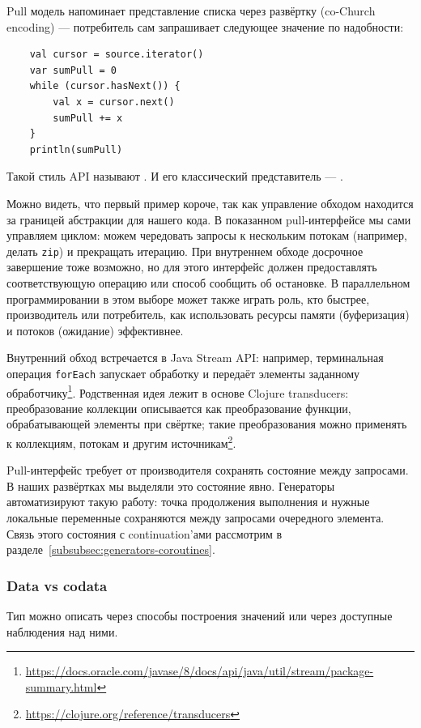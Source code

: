 Pull модель напоминает представление списка через развёртку (co-Church encoding) --- потребитель сам запрашивает следующее значение по надобности:
\begin{verbatim}
    val cursor = source.iterator()
    var sumPull = 0
    while (cursor.hasNext()) {
        val x = cursor.next()
        sumPull += x
    }
    println(sumPull)
\end{verbatim}
Такой стиль API называют .
И его классический представитель  --- .

Можно видеть, что первый пример короче, так как управление обходом находится за границей абстракции для нашего кода.
В показанном pull-интерфейсе мы сами управляем циклом: можем чередовать запросы к нескольким потокам (например, делать \texttt{zip}) и прекращать итерацию.
При внутреннем обходе досрочное завершение тоже возможно, но для этого интерфейс должен предоставлять соответствующую операцию или способ сообщить об остановке.
В параллельном программировании в этом выборе может также играть роль, кто быстрее, производитель или потребитель, как использовать ресурсы памяти (буферизация) и потоков (ожидание) эффективнее.

Внутренний обход встречается в Java Stream API: например, терминальная операция \texttt{forEach} запускает обработку и передаёт элементы заданному обработчику\footnote{\url{https://docs.oracle.com/javase/8/docs/api/java/util/stream/package-summary.html}}.
Родственная идея лежит в основе Clojure transducers: преобразование коллекции описывается как преобразование функции, обрабатывающей элементы при свёртке; такие преобразования можно применять к коллекциям, потокам и другим источникам\footnote{\url{https://clojure.org/reference/transducers}}.

Pull-интерфейс требует от производителя сохранять состояние между запросами.
В наших развёртках мы выделяли это состояние явно.
Генераторы автоматизируют такую работу: точка продолжения выполнения и нужные локальные переменные сохраняются между запросами очередного элемента.
Связь этого состояния с continuation'ами рассмотрим в разделе~\ref{subsubsec:generators-coroutines}.

\subsubsection{Data vs codata} \label{subsubsec:data-codata}

Тип можно описать через способы построения значений или через доступные наблюдения над ними.

